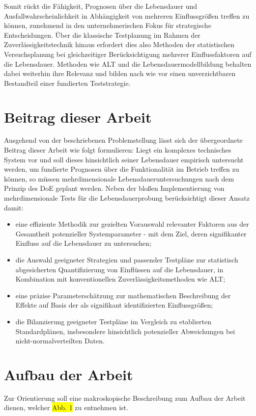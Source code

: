 Somit rückt die Fähigkeit, Prognosen über die Lebensdauer und Ausfallwahrscheinlichkeit in Abhängigkeit von mehreren Einflussgrößen treffen zu können, zunehmend in den unternehmerischen Fokus für strategische Entscheidungen.
Über die klassische Testplanung im Rahmen der Zuverlässigkeitstechnik hinaus erfordert dies also Methoden der statistischen Versuchsplanung bei gleichzeitiger Berücksichtigung mehrerer Einflussfaktoren auf die Lebensdauer.
Methoden wie \acs{ALT} und die Lebensdauermodellbildung behalten dabei weiterhin ihre Relevanz und bilden nach wie vor einen unverzichtbaren Bestandteil einer fundierten Teststrategie.

\section{Beitrag dieser Arbeit}
Ausgehend von der beschriebenen Problemstellung lässt sich der übergeordnete Beitrag dieser Arbeit wie folgt formulieren: Liegt ein komplexes technisches System vor und soll dieses hinsichtlich seiner Lebensdauer empirisch untersucht werden, um fundierte Prognosen über die Funktionalität im Betrieb treffen zu können, so müssen mehrdimensionale Lebensdaueruntersuchungen nach dem Prinzip des \ac{DoE} geplant werden.
Neben der bloßen Implementierung von mehrdimensionale Tests für die Lebensdauerprobung berücksichtigt dieser Ansatz damit:
\begin{itemize}
    \item eine effiziente Methodik zur gezielten Vorauswahl relevanter Faktoren aus der Gesamtheit potenzieller Systemparameter - mit dem Ziel, deren signifikanter Einfluss auf die Lebensdauer zu untersuchen;
    \item die Auswahl geeigneter Strategien und passender Testpläne zur statistisch abgesicherten Quantifizierung von Einflüssen auf die Lebensdauer, in Kombination mit konventionellen Zuverlässigkeitsmethoden wie \acs{ALT};
    \item eine präzise Parameterschätzung zur mathematischen Beschreibung der Effekte auf Basis der als signifikant identifizierten Einflussgrößen;
    \item die Bilanzierung geeigneter Testpläne im Vergleich zu etablierten Standardplänen, insbesondere hinsichtlich potenzieller Abweichungen bei nicht-normalverteilten Daten.
\end{itemize}

\section{Aufbau der Arbeit}
Zur Orientierung soll eine makroskopische Beschreibung zum Aufbau der Arbeit dienen, welcher \colorbox{yellow}{Abb. 1} zu entnehmen ist.

